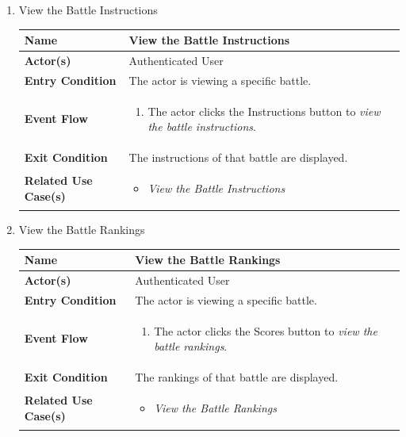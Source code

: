 \begin{enumerate}
\newpage


\item View the Battle Instructions
\begin{center}
    \begin{tabular}{ | m{10em} | m{10cm}| } 
      \hline
      \textbf{Name} & View the Battle Instructions \\ 
      \hline
      \textbf{Actor(s)} & Authenticated User \\ 
      \hline
      \textbf{Entry Condition} & The actor is viewing a specific battle. \\ 
      \hline
      \textbf{Event Flow} & 
          \begin{enumerate}[(1)]
              \item The actor clicks the Instructions button to \textit{view the battle instructions}.
          \end{enumerate}
      \\ 
      \hline
      \textbf{Exit Condition} & The instructions of that battle are displayed.  \\ 
      \hline
      \textbf{Related Use Case(s)} & 
      \begin{itemize}
          \item \textit{View the Battle Instructions}
      \end{itemize}
          \\ 
      \hline
    \end{tabular}
\end{center}

\item View the Battle Rankings
\begin{center}
    \begin{tabular}{ | m{10em} | m{10cm}| } 
      \hline
      \textbf{Name} & View the Battle Rankings \\ 
      \hline
      \textbf{Actor(s)} & Authenticated User \\ 
      \hline
      \textbf{Entry Condition} & The actor is viewing a specific battle. \\ 
      \hline
      \textbf{Event Flow} & 
          \begin{enumerate}[(1)]
              \item The actor clicks the Scores button to \textit{view the battle rankings}.
          \end{enumerate}
      \\ 
      \hline
      \textbf{Exit Condition} & The rankings of that battle are displayed.  \\ 
      \hline
      \textbf{Related Use Case(s)} & 
      \begin{itemize}
\item \textit{View the Battle Rankings}
      \end{itemize}
          \\ 
      \hline
    \end{tabular}
\end{center}



\end{enumerate}
